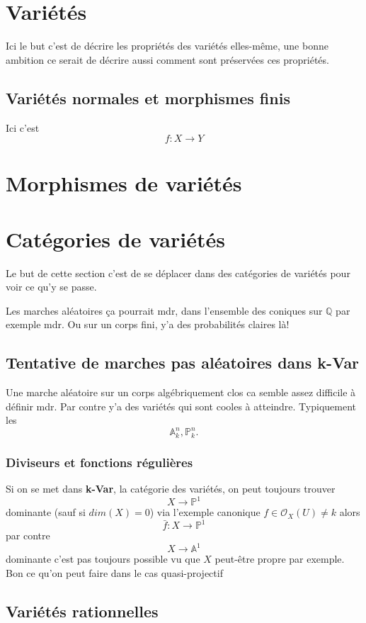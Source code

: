 \documentclass[a4paper,12pt]{book}
\newcommand{\Q}{\mathbb{Q}}
\newcommand{\A}{\mathbb{A}}
\newcommand{\Or}{\mathcal{O}}
\renewcommand{\P}{\mathbb{P}}
\theoremstyle{plain}
\theoremstyle{definition}
\theoremstyle{remark}
\begin{document}
\chapter{Variétés}
Ici le but c'est de décrire les propriétés des variétés elles-même,
une bonne ambition ce serait de décrire aussi comment sont préservées
ces propriétés.
\section{Variétés normales et morphismes finis}
Ici c'est 
\[f\colon X\to Y\]
\chapter{Morphismes de variétés}


\chapter{Catégories de variétés}
Le but de cette section c'est de se déplacer dans des catégories 
de variétés pour voir ce qu'y se passe. 

Les marches aléatoires ça pourrait mdr, dans l'ensemble des coniques
sur $\Q$ par exemple mdr. Ou sur un corps fini, y'a des probabilités
claires là!
\section{Tentative de marches pas aléatoires dans \textbf{k-Var}}
Une marche aléatoire sur un corps algébriquement clos ca semble assez
difficile à définir mdr. Par contre y'a des variétés qui sont cooles
à atteindre. Typiquement les
\[\A^n_k,\P^n_k.\]
\subsection*{Diviseurs et fonctions régulières}
Si on se met dans \textbf{k-Var}, la catégorie des variétés,
on peut toujours trouver 
\[X\to \P^1\]
dominante (sauf si $dim(X)=0$) via l'exemple canonique 
$f\in \Or_X(U)\ne k$ alors 
\[\bar f\colon X\to \P^1\]
par contre 
\[X\to \A^1\]
dominante c'est pas toujours possible vu que $X$ peut-être propre par
exemple. 
Bon ce qu'on peut faire dans le cas quasi-projectif


\section{Variétés rationnelles}







\printbibliography
\end{document}
